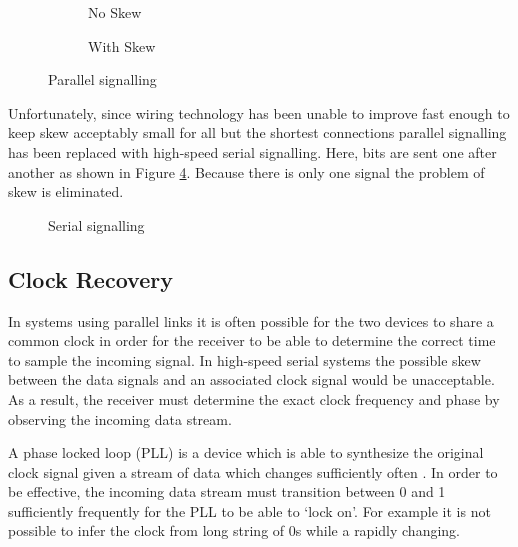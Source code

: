 			\begin{figure}
				\begin{subfigure}[b]{0.49\textwidth}
					\center
					
					\caption{No Skew}
					\label{fig:parallel-example-no-skew}
				\end{subfigure}
				\begin{subfigure}[b]{0.49\textwidth}
					\center
					
					\caption{With Skew}
					\label{fig:parallel-example-skew}
				\end{subfigure}
				
				\caption{Parallel signalling}
				\label{fig:parallel-example}
			\end{figure}
			
			Unfortunately, since wiring technology has been unable to improve fast
			enough to keep skew acceptably small for all but the shortest connections
			parallel signalling has been replaced with high-speed serial signalling.
			Here, bits are sent one after another as shown in Figure
			\ref{fig:serial-example}. Because there is only one signal the problem of
			skew is eliminated.
			
			\begin{figure}
				\center
				\begin{tikzpicture}
					
				\end{tikzpicture}
				
				\caption{Serial signalling}
				\label{fig:serial-example}
			\end{figure}
		
		
		\subsection{Clock Recovery}
			
			In systems using parallel links it is often possible for the two devices
			to share a common clock in order for the receiver to be able to determine
			the correct time to sample the incoming signal. In high-speed serial
			systems the possible skew between the data signals and an associated clock
			signal would be unacceptable. As a result, the receiver must determine the
			exact clock frequency and phase by observing the incoming data stream.
			
			A phase locked loop (PLL) is a device which is able to synthesize the
			original clock signal given a stream of data which changes sufficiently
			often \cite{athavale05}. In order to be effective, the incoming data
			stream must transition between 0 and 1 sufficiently frequently for the PLL
			to be able to `lock on'. For example it is not possible to infer the clock
			from long string of 0s while a rapidly changing.
			

